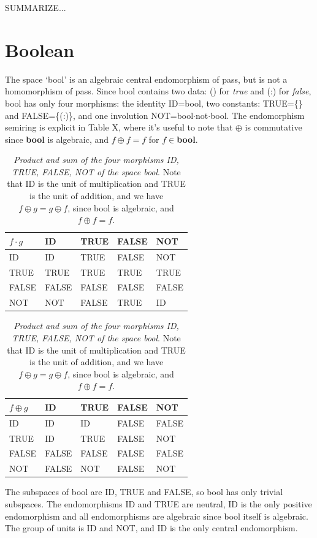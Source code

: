 \documentclass[11pt]{article}
\begin{document}
SUMMARIZE...

\section{Boolean} 

      The space `bool' is an algebraic central endomorphism of pass, but is not a homomorphism of pass.  
Since bool contains two data:  () for {\it true} and (:) for {\it false}, bool has only four morphisms:  the identity ID=bool, two constants: TRUE=\{\} and FALSE=\{(:)\}, and one involution NOT=bool$\cdot$not$\cdot$bool.  The endomorphism semiring is explicit in Table X, where it's useful to note that $\oplus$ is 
commutative since {\bf bool} is algebraic, and $f\oplus f=f$ for $f\in${\bf bool}.  

\begin{table}
\begin{tabular}{| l | l | l | l | l |  }
$f\cdot g$ & ID & TRUE & FALSE & NOT  \\
\hline
ID &  ID & TRUE & FALSE &  NOT \\
TRUE & TRUE & TRUE  & TRUE & TRUE \\
FALSE & FALSE  & FALSE & FALSE & FALSE   \\
NOT & NOT & FALSE & TRUE & ID \\
\hline
\end{tabular}
\begin{tabular}{| l | l | l | l | l |  }
$f\oplus g$ & ID & TRUE & FALSE & NOT  \\
\hline
ID &  ID & ID & FALSE & FALSE \\
TRUE & ID & TRUE  & FALSE & NOT \\
FALSE & FALSE  & FALSE & FALSE & FALSE   \\
NOT & FALSE & NOT & FALSE & NOT \\
\hline
\end{tabular}
\caption{{\it Product and sum of the four morphisms ID, TRUE, FALSE, NOT of the space bool}.  Note that ID is the unit of multiplication and TRUE is the 
unit of addition, and we have $f\oplus g=g\oplus f$, since bool is algebraic, and $f\oplus f=f$.}
\end{table}

The subspaces of bool are ID, TRUE and FALSE, so bool has only trivial subspaces.  The endomorphisms ID and TRUE are neutral, ID is the only positive 
endomorphism and all endomorphisms are algebraic since bool itself is algebraic.  The group of units is ID and NOT, and ID is the only central endomorphism. 
\end{document}

